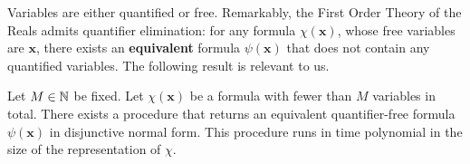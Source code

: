 Variables are either quantified or free. Remarkably, the First Order Theory of the Reals admits quantifier elimination: for any formula $\chi(\mathbf{x})$, whose free variables are $\mathbf{x}$, there exists an \textbf{equivalent} formula $\psi(\mathbf{x})$ that does not contain any quantified variables. The following result is relevant to us.
\begin{theorem}
\label{thm:renegar2}
Let $M \in \mathbb{N}$ be fixed. Let $\chi(\mathbf{x})$ be a formula with fewer than $M$ variables in total. There exists a procedure that returns an equivalent quantifier-free formula $\psi(\mathbf{x})$ in disjunctive normal form. This procedure runs in time polynomial in the size of the representation of $\chi$.
\end{theorem} 
